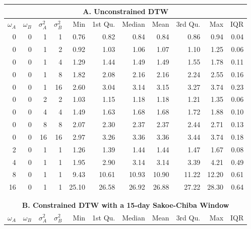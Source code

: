 \documentclass[12pt]{report}
\begin{document}
\begin{table}[!ht]
    \fontsize{10pt}{10pt}\selectfont
    \begin{center}
      \begin{tabular}{r r r r | r r r r r r r}
        \multicolumn{11}{c}{\textbf{A. Unconstrained DTW}} \\
        \midrule
        $\omega_{A}$ & $\omega_{B}$ & $\sigma^{2}_{A}$ & $\sigma^{2}_{B}$ & Min & 1st Qu. & Median & Mean & 3rd Qu. & Max & IQR \\
        \midrule
        0  & 0 & 1  & 1  & 0.76 & 0.82 & 0.84 & 0.84 & 0.86 & 0.94 & 0.04 \\
        \midrule
        0  & 0 & 1  & 2  & 0.92 & 1.03 & 1.06 & 1.07 & 1.10 & 1.25 & 0.06 \\
        0  & 0 & 1  & 4  & 1.29 & 1.44 & 1.49 & 1.49 & 1.55 & 1.78 & 0.11 \\
        0  & 0 & 1  & 8  & 1.82 & 2.08 & 2.16 & 2.16 & 2.24 & 2.55 & 0.16 \\
        0  & 0 & 1  & 16 & 2.60 & 3.04 & 3.14 & 3.15 & 3.27 & 3.74 & 0.23 \\
        \midrule
        0  & 0 & 2  & 2  & 1.03 & 1.15 & 1.18 & 1.18 & 1.21 & 1.35 & 0.06 \\
        0  & 0 & 4  & 4  & 1.49 & 1.63 & 1.68 & 1.68 & 1.72 & 1.88 & 0.10 \\
        0  & 0 & 8  & 8  & 2.07 & 2.30 & 2.37 & 2.37 & 2.44 & 2.71 & 0.13 \\
        0  & 0 & 16 & 16 & 2.97 & 3.26 & 3.36 & 3.36 & 3.44 & 3.74 & 0.18 \\
        \midrule
        2  & 0 & 1  & 1  &  1.26 &  1.39 &  1.44 &  1.44 &  1.47 &  1.67 & 0.08 \\
        4  & 0 & 1  & 1  &  1.95 &  2.90 &  3.14 &  3.14 &  3.39 &  4.21 & 0.49 \\
        8  & 0 & 1  & 1  &  9.43 & 10.61 & 10.93 & 10.90 & 11.22 & 12.20 & 0.61 \\
        16 & 0 & 1  & 1  & 25.10 & 26.58 & 26.92 & 26.88 & 27.22 & 28.30 & 0.64 \\
        \hline
        \\
        \\
        \multicolumn{11}{c}{\textbf{B. Constrained DTW with a 15-day Sakoe-Chiba Window}} \\
        \midrule
        $\omega_{A}$ & $\omega_{B}$ & $\sigma^{2}_{A}$ & $\sigma^{2}_{B}$ & Min & 1st Qu. & Median & Mean & 3rd Qu. & Max & IQR \\
        \midrule

\end{tabular}
\end{center}
\end{table}
\end{document}
